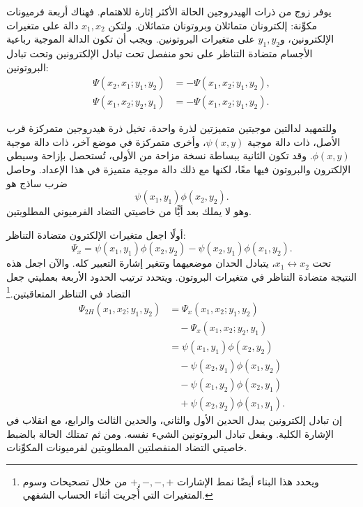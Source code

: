 يوفر زوج من ذرات الهيدروجين الحالة الأكثر إثارة للاهتمام. فهناك أربعة فرميونات مكوِّنة: إلكترونان متماثلان وبروتونان متماثلان. ولتكن \(x_1,x_2\) دالة على متغيرات الإلكترونين، و\(y_1,y_2\) على متغيرات البروتونين. ويجب أن تكون الدالة الموجية رباعية الأجسام متضادة التناظر على نحو منفصل تحت تبادل الإلكترونين وتحت تبادل البروتونين:
\begin{align}
\Psi(x_2,x_1;y_1,y_2)
&=-\Psi(x_1,x_2;y_1,y_2),\\
\Psi(x_1,x_2;y_2,y_1)
&=-\Psi(x_1,x_2;y_1,y_2).
\end{align}

وللتمهيد لدالتين موجيتين متميزتين لذرة واحدة، تخيل ذرة هيدروجين متمركزة قرب الأصل، ذات دالة موجية \(\psi(x,y)\)، وأخرى متمركزة في موضع آخر، ذات دالة موجية \(\phi(x,y)\). وقد تكون الثانية ببساطة نسخة مزاحة من الأولى، تُستحصل بإزاحة وسيطي الإلكترون والبروتون فيها معًا، لكنها مع ذلك دالة موجية متميزة في هذا الإعداد. وحاصل ضرب ساذج هو
\begin{equation}
\psi(x_1,y_1)\phi(x_2,y_2).
\end{equation}
وهو لا يملك بعد أيًّا من خاصيتي التضاد الفرميوني المطلوبتين.

أولًا اجعل متغيرات الإلكترون متضادة التناظر:
\begin{equation}
\Psi_x=
\psi(x_1,y_1)\phi(x_2,y_2)
-\psi(x_2,y_1)\phi(x_1,y_2).
\end{equation}
تحت \(x_1\leftrightarrow x_2\)، يتبادل الحدان موضعيهما وتتغير إشارة التعبير كله. والآن اجعل هذه النتيجة متضادة التناظر في متغيرات البروتون. ويتحدد ترتيب الحدود الأربعة بعمليتي جعل التضاد في التناظر المتعاقبتين.\footnote{ويحدد هذا البناء أيضًا نمط الإشارات \(+,-,-,+\) من خلال تصحيحات وسوم المتغيرات التي أُجريت أثناء الحساب الشفهي.}
\begin{align}
\Psi_{2H}(x_1,x_2;y_1,y_2)
&=\Psi_x(x_1,x_2;y_1,y_2)\nonumber\\
&\quad{}-\Psi_x(x_1,x_2;y_2,y_1)\\
&=\psi(x_1,y_1)\phi(x_2,y_2)\nonumber\\
&\quad{}-\psi(x_2,y_1)\phi(x_1,y_2)\nonumber\\
&\quad{}-\psi(x_1,y_2)\phi(x_2,y_1)\nonumber\\
&\quad{}+\psi(x_2,y_2)\phi(x_1,y_1).
\label{eq:two-hydrogen-antisymmetrized}
\end{align}
إن تبادل إلكترونين يبدل الحدين الأول والثاني، والحدين الثالث والرابع، مع انقلاب في الإشارة الكلية. ويفعل تبادل البروتونين الشيء نفسه. ومن ثم تمتلك الحالة بالضبط خاصيتي التضاد المنفصلتين المطلوبتين لفرميونات المكوِّنات.

